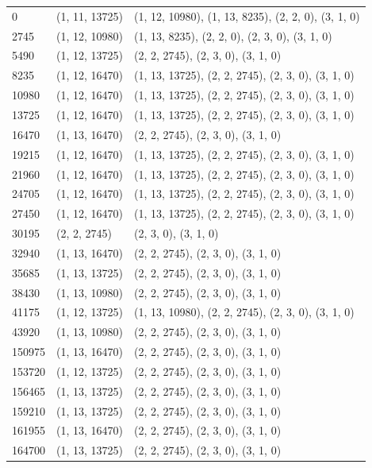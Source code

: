 \begin{center}
\begin{longtable}{|l|l|l|}
0 & (1, 11, 13725) & (1, 12, 10980), (1, 13, 8235), (2, 2, 0), (3, 1, 0) \\
2745 & (1, 12, 10980) & (1, 13, 8235), (2, 2, 0), (2, 3, 0), (3, 1, 0) \\
5490 & (1, 12, 13725) & (2, 2, 2745), (2, 3, 0), (3, 1, 0) \\
8235 & (1, 12, 16470) & (1, 13, 13725), (2, 2, 2745), (2, 3, 0), (3, 1, 0) \\
10980 & (1, 12, 16470) & (1, 13, 13725), (2, 2, 2745), (2, 3, 0), (3, 1, 0) \\
13725 & (1, 12, 16470) & (1, 13, 13725), (2, 2, 2745), (2, 3, 0), (3, 1, 0) \\
16470 & (1, 13, 16470) & (2, 2, 2745), (2, 3, 0), (3, 1, 0) \\
19215 & (1, 12, 16470) & (1, 13, 13725), (2, 2, 2745), (2, 3, 0), (3, 1, 0) \\
21960 & (1, 12, 16470) & (1, 13, 13725), (2, 2, 2745), (2, 3, 0), (3, 1, 0) \\
24705 & (1, 12, 16470) & (1, 13, 13725), (2, 2, 2745), (2, 3, 0), (3, 1, 0) \\
27450 & (1, 12, 16470) & (1, 13, 13725), (2, 2, 2745), (2, 3, 0), (3, 1, 0) \\
30195 & (2, 2, 2745) & (2, 3, 0), (3, 1, 0) \\
32940 & (1, 13, 16470) & (2, 2, 2745), (2, 3, 0), (3, 1, 0) \\
35685 & (1, 13, 13725) & (2, 2, 2745), (2, 3, 0), (3, 1, 0) \\
38430 & (1, 13, 10980) & (2, 2, 2745), (2, 3, 0), (3, 1, 0) \\
41175 & (1, 12, 13725) & (1, 13, 10980), (2, 2, 2745), (2, 3, 0), (3, 1, 0) \\
43920 & (1, 13, 10980) & (2, 2, 2745), (2, 3, 0), (3, 1, 0) \\
150975 & (1, 13, 16470) & (2, 2, 2745), (2, 3, 0), (3, 1, 0) \\
153720 & (1, 12, 13725) & (2, 2, 2745), (2, 3, 0), (3, 1, 0) \\
156465 & (1, 13, 13725) & (2, 2, 2745), (2, 3, 0), (3, 1, 0) \\
159210 & (1, 13, 13725) & (2, 2, 2745), (2, 3, 0), (3, 1, 0) \\
161955 & (1, 13, 16470) & (2, 2, 2745), (2, 3, 0), (3, 1, 0) \\
164700 & (1, 13, 13725) & (2, 2, 2745), (2, 3, 0), (3, 1, 0) \\
\end{longtable}
\end{center}

